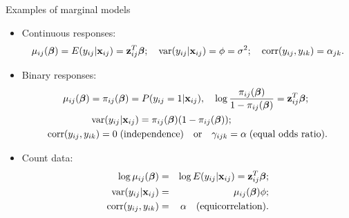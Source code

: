 \documentclass{beamer}
\begin{document}
\begin{frame}{Examples of marginal models}

\begin{itemize}
\item[I]
Continuous responses:
$$\mu_{ij}(\mbox{\boldmath $\beta$})=E(y_{ij}|\textbf{x}_{ij})=\textbf{z}_{ij}^T\mbox{\boldmath $\beta$}; \quad
\mbox{var}(y_{ij}|\textbf{x}_{ij})=\phi=\sigma^2;\quad \mbox{corr}(y_{ij}, y_{ik})=\alpha_{jk}.$$
\item[II]
Binary responses: 
\begin{eqnarray*}
\mu_{ij}(\mbox{\boldmath $\beta$})=\pi_{ij}(\mbox{\boldmath $\beta$})=P(y_{ij}=1|\textbf{x}_{ij}),
\quad \log\frac{\pi_{ij}(\mbox{\boldmath $\beta$})}{1-\pi_{ij}(\mbox{\boldmath $\beta$})} 
=\textbf{z}_{ij}^T\mbox{\boldmath $\beta$}; \hspace{20pt}\\
\mbox{var}(y_{ij}|\textbf{x}_{ij})=\pi_{ij}(\mbox{\boldmath $\beta$})(1-\pi_{ij}(\mbox{\boldmath $\beta$}));
\hspace{100pt} \\
\mbox{corr}(y_{ij},y_{ik})=0\;\mbox{(independence)}\quad \mbox{or}\quad \gamma_{ijk}=\alpha\; 
\mbox{(equal odds ratio)}.
\end{eqnarray*}
\item[III]
Count data:
\begin{eqnarray*}
\log\mu_{ij}(\mbox{\boldmath $\beta$})&=&\log E(y_{ij}|\textbf{x}_{ij})=\textbf{z}_{ij}^T\mbox{\boldmath $\beta$}; \\
\mbox{var}(y_{ij}|\textbf{x}_{ij})&=&\mu_{ij}(\mbox{\boldmath $\beta$})\phi; \\
\mbox{corr}(y_{ij},y_{ik})&=&\alpha\quad \mbox{(equicorrelation)}.
\end{eqnarray*}
\end{itemize}
\end{frame}
\end{document}
